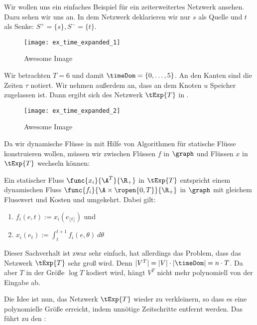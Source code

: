 \begin{example}
    Wir wollen uns ein einfaches Beispiel für ein zeiterweitertes Netzwerk 
    ansehen. Dazu sehen wir uns  an. In dem
    Netzwerk deklarieren wir nur $s$ als Quelle und $t$ als Senke:
    $S^+ = \{s\}, S^- = \{t\}$.

    \begin{figure}[H]
    \centering
    \texttt{[image: ex\_time\_expanded\_1]}
    \caption{Awesome Image}
    \label{fig:ex_time_expanded_1}
    \end{figure}

    Wir betrachten $T = 6$ und damit $\timeDom = \{0, \ldots, 5\}$. An den
    Kanten sind die Zeiten $\tau$ notiert. Wir nehmen außerdem an, dass
    an dem Knoten $u$ Speicher zugelassen ist. Dann ergibt sich
    des Netzwerk $\tExp{T}$ in .

    \begin{figure}[H]
    \centering
    \texttt{[image: ex\_time\_expanded\_2]}
    \caption{Awesome Image}
    \label{fig:ex_time_expanded_2}
    \end{figure}
\end{example}

Da wir dynamische Flüsse in mit Hilfe von Algorithmen für statische Flüsse
konstruieren wollen, müssen wir zwischen Flüssen $f$ in $\graph$ und
Flüssen $x$ in $\tExp{T}$ wechseln können:

\begin{lemma}\label{lem:static_dyn_conv}
    Ein statischer Fluss $\func{x_i}{\A^T}{\R_+}$ in $\tExp{T}$ entspricht einem
    dynamischen Fluss $\func{f_i}{\A \times \ropen{0,T}}{\R_+}$ in $\graph$
    mit gleichem Flusswert und Kosten und umgekehrt. Dabei gilt:
    \begin{enumerate}
        \item $f_i(e,t) := x_i(e_{\lfloor t \rfloor})$ und
        \item $x_i(e_t) := \int_t^{t+1} f_i(e, \theta) \: d\theta$
    \end{enumerate}
\end{lemma}

Dieser Sachverhalt ist zwar sehr einfach, hat allerdings das Problem, dass das
Netzwerk $\tExp{T}$ sehr groß wird. Denn $|V^T| = |V| \cdot |\timeDom| = n \cdot T$.
Da aber $T$ in der Größe $\log T$ kodiert wird, hängt $V^T$ nicht mehr polynomiell
von der Eingabe ab.

Die Idee ist nun, das Netzwerk $\tExp{T}$ wieder zu verkleinern, so dass es
eine polynomielle Größe erreicht, indem unnötige Zeitschritte entfernt werden.
Das führt zu den :

